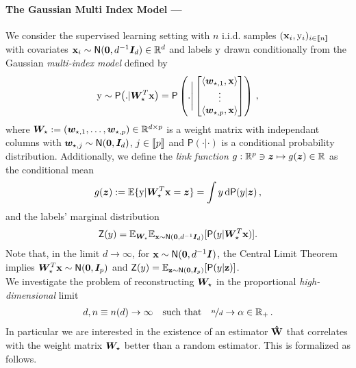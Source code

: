\paragraph{The Gaussian Multi Index Model ---}
We consider the supervised learning setting with $n$ i.i.d. samples $(\boldsymbol{\mathbf{x}}_i, { \mathrm{y} }_i)_{i\in  \llbracket n \rrbracket }$ with covariates $\boldsymbol{\mathbf{x}}_i\sim \mathsf{N} ({\boldsymbol 0}, d^{-1}{\boldsymbol I}_d)\in\mathbb{R}^d$ and labels ${ \mathrm{y} }$ drawn conditionally  from the Gaussian \textit{multi-index model} defined by
\begin{equation}
\label{eq:def:gmim}
    {\ensuremath{ \mathrm{y} }} \sim \mathsf{P} \big( . | \bm{W}_{\star}^T\boldsymbol{\mathbf{x}} \big)  = \mathsf{P} \left(. \Bigg |
    \begin{bmatrix}
    \langle \bm{w}_{\star,1}, \boldsymbol{\mathbf{x}} \rangle \\
    \vdots \\
     \langle \bm{w}_{\star,p}, \boldsymbol{\mathbf{x}} \rangle
    \end{bmatrix}
    \right) \, , 
\end{equation}
where ${\boldsymbol W}_\star := ({\boldsymbol w}_{\star,1}, \dots, {\boldsymbol w}_{\star,p}) \in\mathbb{R}^{d\times p}$ is a weight matrix with independant columns with ${\boldsymbol w}_{\star,j}\sim \mathsf{N}({\boldsymbol 0},{\boldsymbol I}_d)$, $j\in \llbracket p \rrbracket $ and $\mathsf{P}(\cdot | \cdot)$ is a conditional probability distribution. Additionally, we define the \emph{link function} $g:\mathbb{R}^p \ni \bm{z} \mapsto  g(\bm{z}) \in \mathbb{R}$ as the conditional mean
\begin{equation}
\label{eq:def:multi_index_model}
     g(\bm{z}) := \mathbb{E} \{ { \mathrm{y} } | \bm{W}_{\star}^T\boldsymbol{\mathbf{x}} = \bm{z}  \}  = \int y \,  \mathrm{d}\mathsf{P}(y|{\boldsymbol z})\,,
\end{equation}
and the labels' marginal distribution
\begin{equation}
    \mathsf{Z}(y) = \mathbb{E}_{{\boldsymbol W}_\star}\mathbb{E}_{\boldsymbol{\mathbf{x}}\sim\mathsf{N}({\boldsymbol 0},d^{-1}{\boldsymbol I}_d)}[\mathsf{P}(y|{\boldsymbol W}_\star^T\boldsymbol{\mathbf{x}})].
\end{equation}
Note that, in the limit $d\to\infty$, for $\boldsymbol{\mathbf{x}}\sim\mathsf{N}({\boldsymbol 0},d^{-1}{\boldsymbol I})$, the Central Limit Theorem implies ${\boldsymbol W}_\star^T\boldsymbol{\mathbf{x}}\sim\mathsf{N}({\boldsymbol 0},{\boldsymbol I}_p)$ and $ \mathsf{Z}(y) = \mathbb{E}_{\boldsymbol{\mathbf{z}}\sim\mathsf{N}({\boldsymbol 0},{\boldsymbol I}_p)}[\mathsf{P}(y|\boldsymbol{\mathbf{z}})]$.\\
We investigate the problem of reconstructing ${\boldsymbol W}_\star$ in the proportional \textit{high-dimensional} limit
\begin{align}
    d,n \equiv n(d)\to\infty \quad \mbox{such that}  \quad \nicefrac{n}{d}\to\alpha\in\mathbb{R}_{+} \, .
\end{align}
In particular we are interested in the existence of an estimator $\boldsymbol{\mathbf{\hat{W}}}$ that correlates with the weight matrix $\bm{W}_{\star}$ better than a random estimator. This is formalized as follows.
